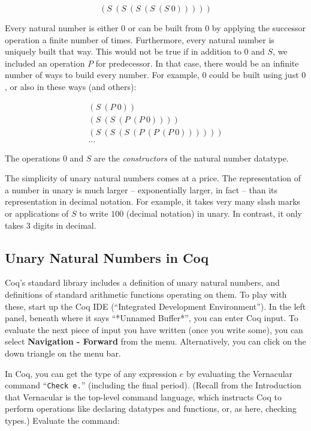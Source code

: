 \documentclass{book}[12pt]
\begin{document}
\[ (S\ (S\ (S\ (S\ (S\ 0))))) \]

Every natural number is either $0$ or can be built from $0$ by
applying the successor operation a finite number of times.
Furthermore, every natural number is uniquely built that way.  This
would not be true if in addition to $0$ and $S$, we included an
operation $P$ for predecessor.  In that case, there would be an
infinite number of ways to build every number.  For example, $0$ could
be built using just $0$, or also in these ways (and others):

\[ 
\begin{array}{l}
(S\ (P\ 0)) \\
(S\ (S\ (P\ (P\ 0)))) \\
(S\ (S\ (S\ (P\ (P\ (P\ 0)))))) \\
\ldots
\end{array}
\]

\noindent The operations $0$ and $S$ are the \emph{constructors} of
the natural number datatype.

The simplicity of unary natural numbers comes at a price.  The
representation of a number in unary is much larger -- exponentially
larger, in fact -- than its representation in decimal notation.  For
example, it takes very many slash marks or applications of $S$ to
write $100$ (decimal notation) in unary.  In contrast, it only takes 3
digits in decimal.

\subsection{Unary Natural Numbers in Coq}
\label{sec:natcoq}

Coq's standard library includes a definition of unary natural numbers,
and definitions of standard arithmetic functions operating on them.
To play with these, start up the Coq IDE (``Integrated Development
Environment'').  In the left panel, beneath where it says
``*Unnamed Buffer*'', you can enter Coq input.  To evaluate the next
piece of input you have written (once you write some), you can select
\textbf{Navigation - Forward} from the menu.  Alternatively, you can
click on the down triangle on the menu bar.

In Coq, you can get the type of any expression $e$ by evaluating the
Vernacular command ``\texttt{Check e.}'' (including the final period).
(Recall from the Introduction that Vernacular is the top-level command
language, which instructs Coq to perform operations like declaring
datatypes and functions, or, as here, checking types.)  Evaluate the
command:
\end{document}

